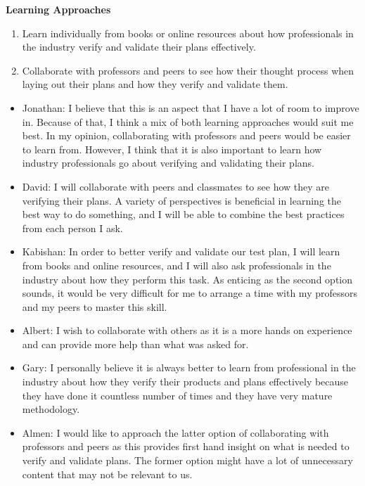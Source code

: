 \documentclass[12pt, titlepage]{article}
\begin{document}
\noindent \textbf{Learning Approaches}
\begin{enumerate}
    \item Learn individually from books or online resources about how
    professionals in the industry verify and validate their plans effectively.
    \item Collaborate with professors and peers to see how their thought process
    when laying out their plans and how they verify and validate them.
\end{enumerate}

\begin{itemize}
    \item Jonathan: I believe that this is an aspect that I have a lot of room
    to improve in. Because of that, I think a mix of both learning approaches
    would suit me best. In my opinion, collaborating with professors and peers
    would be easier to learn from. However, I think that it is also important to
    learn how industry professionals go about verifying and validating their
    plans. 
    \item David: I will collaborate with peers and classmates to see how they
    are verifying their plans. A variety of perspectives is beneficial in
    learning the best way to do something, and I will be able to combine the
    best practices from each person I ask.
    \item Kabishan: In order to better verify and validate our test plan, I will
    learn from books and online resources, and I will also ask professionals in
    the industry about how they perform this task. As enticing as the second
    option sounds, it would be very difficult for me to arrange a time with my
    professors and my peers to master this skill.
    \item Albert: I wish to collaborate with others as it is a more hands on
    experience and can provide more help than what was asked for.
    \item Gary: I personally believe it is always better to learn from
    professional in the industry about how they verify their products and plans
    effectively because they have done it countless number of times and they
    have very mature methodology.
    \item Almen: I would like to approach the latter option of collaborating
    with professors and peers as this provides first hand insight on what is
    needed to verify and validate plans. The former option might have a lot of
    unnecessary content that may not be relevant to us.
\end{itemize}
\end{document}
